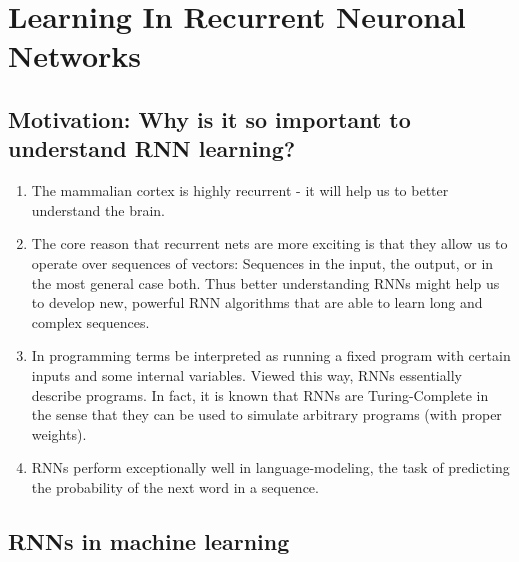\documentclass[main]{subfiles}
\begin{document}
\newpage
\section{Learning In Recurrent Neuronal Networks}
\subsection{Motivation: Why is it so important to understand RNN learning?}
\begin{enumerate}
    \item The mammalian cortex is highly recurrent - it will help us to better understand the brain.
    \item The core reason that recurrent nets are more exciting is that they allow us to operate over sequences of vectors: Sequences in the input, the output, or in the most general case both. Thus better understanding RNNs might help us to develop new, powerful RNN algorithms that are able to learn long and complex sequences.
    \item In programming terms be interpreted as running a fixed program with certain inputs and some internal variables. Viewed this way, RNNs essentially describe programs. In fact, it is known that RNNs are Turing-Complete in the sense that they can be used to simulate arbitrary programs (with proper weights).
    \item RNNs perform exceptionally well in language-modeling, the task of predicting the probability of the next word in a sequence.
\end{enumerate}


\subsection{RNNs in machine learning}
\end{document}
